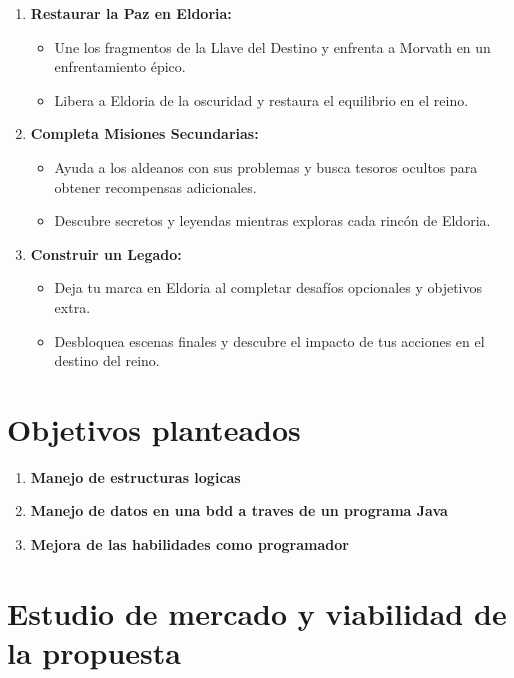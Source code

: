 \documentclass[a4paper]{article}
\begin{document}
\begin{enumerate}
        \item \textbf{Restaurar la Paz en Eldoria:}
            \begin{itemize}
                \item Une los fragmentos de la Llave del Destino y enfrenta a Morvath en un enfrentamiento épico.
                \item Libera a Eldoria de la oscuridad y restaura el equilibrio en el reino.
            \end{itemize}
    
        \item \textbf{Completa Misiones Secundarias:}
            \begin{itemize}
                \item Ayuda a los aldeanos con sus problemas y busca tesoros ocultos para obtener recompensas adicionales.
                \item Descubre secretos y leyendas mientras exploras cada rincón de Eldoria.
            \end{itemize}
    
        \item \textbf{Construir un Legado:}
            \begin{itemize}
                \item Deja tu marca en Eldoria al completar desafíos opcionales y objetivos extra.
                \item Desbloquea escenas finales y descubre el impacto de tus acciones en el destino del reino.
            \end{itemize}
    \end{enumerate}

    \clearpage
    \section{Objetivos planteados}
    \begin{enumerate}
        \item \textbf{Manejo de estructuras logicas}
        \item \textbf{Manejo de datos en una bdd a traves de un programa Java}
        \item \textbf{Mejora de las habilidades como programador}
    \end{enumerate}
    \clearpage
    \section{Estudio de mercado y viabilidad de la propuesta}
\end{document}
